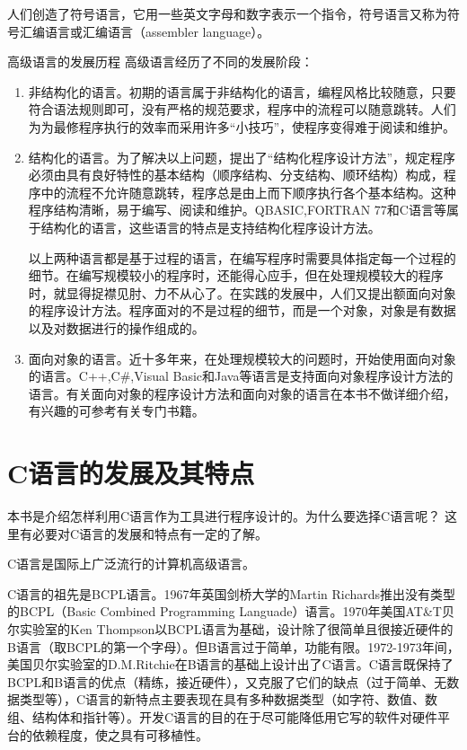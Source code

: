 人们创造了符号语言，它用一些英文字母和数字表示一个指令，符号语言又称为符号汇编语言或汇编语言（assembler language）。

高级语言的发展历程
高级语言经历了不同的发展阶段：
\begin{enumerate}
	\item 非结构化的语言。初期的语言属于非结构化的语言，编程风格比较随意，只要符合语法规则即可，没有严格的规范要求，程序中的流程可以随意跳转。人们为为最修程序执行的效率而采用许多“小技巧”，使程序变得难于阅读和维护。
	\item 结构化的语言。为了解决以上问题，提出了“结构化程序设计方法”，规定程序必须由具有良好特性的基本结构（顺序结构、分支结构、顺环结构）构成，程序中的流程不允许随意跳转，程序总是由上而下顺序执行各个基本结构。这种程序结构清晰，易于编写、阅读和维护。QBASIC,FORTRAN 77和C语言等属于结构化的语言，这些语言的特点是支持结构化程序设计方法。

以上两种语言都是基于过程的语言，在编写程序时需要具体指定每一个过程的细节。在编写规模较小的程序时，还能得心应手，但在处理规模较大的程序时，就显得捉襟见肘、力不从心了。在实践的发展中，人们又提出额面向对象的程序设计方法。程序面对的不是过程的细节，而是一个对象，对象是有数据以及对数据进行的操作组成的。
	\item 面向对象的语言。近十多年来，在处理规模较大的问题时，开始使用面向对象的语言。C++,C#,Visual Basic和Java等语言是支持面向对象程序设计方法的语言。有关面向对象的程序设计方法和面向对象的语言在本书不做详细介绍，有兴趣的可参考有关专门书籍。
\end{enumerate}

\section{C语言的发展及其特点}

本书是介绍怎样利用C语言作为工具进行程序设计的。为什么要选择C语言呢？ 这里有必要对C语言的发展和特点有一定的了解。

C语言是国际上广泛流行的计算机高级语言。

C语言的祖先是BCPL语言。1967年英国剑桥大学的Martin Richards推出没有类型的BCPL（Basic Combined Programming Languade）语言。1970年美国AT&T贝尔实验室的Ken Thompson以BCPL语言为基础，设计除了很简单且很接近硬件的B语言（取BCPL的第一个字母）。但B语言过于简单，功能有限。1972-1973年间，美国贝尔实验室的D.M.Ritchie在B语言的基础上设计出了C语言。C语言既保持了BCPL和B语言的优点（精练，接近硬件），又克服了它们的缺点（过于简单、无数据类型等），C语言的新特点主要表现在具有多种数据类型（如字符、数值、数组、结构体和指针等）。开发C语言的目的在于尽可能降低用它写的软件对硬件平台的依赖程度，使之具有可移植性。

